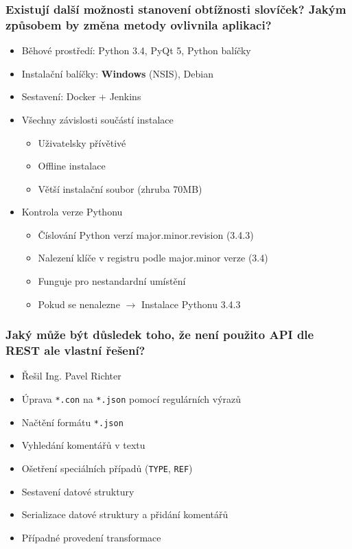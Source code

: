 \begin{frame}[noframenumbering]
\begin{center}
	\frametitle{Existují další možnosti stanovení obtížnosti slovíček? Jakým způsobem by změna metody ovlivnila aplikaci?}
	\begin{itemize}[<+->]
		\item Běhové prostředí: Python 3.4, PyQt 5, Python balíčky
		\item Instalační balíčky: \textbf{Windows} (NSIS), Debian
		\item Sestavení: Docker + Jenkins
		\item Všechny závislosti součástí instalace
		\begin{itemize}
			\item Uživatelsky přívětivé
			\item Offline instalace
			\item Větší instalační soubor (zhruba 70MB)
		\end{itemize}
		\item Kontrola verze Pythonu
		\begin{itemize}
			\item Číslování Python verzí major.minor.revision (3.4.3)
			\item Nalezení klíče v registru podle major.minor verze (3.4)
			\item Funguje pro nestandardní umístění
			\item Pokud se nenalezne $\rightarrow$ Instalace Pythonu 3.4.3
		\end{itemize}
	\end{itemize}
\end{center}
\end{frame}

\begin{frame}[noframenumbering]
\begin{center}
	\frametitle{Jaký může být důsledek toho, že není použito API dle REST ale vlastní řešení?}
	\begin{itemize}[<+->]
		\item Řešil Ing. Pavel Richter
		\item Úprava \texttt{*.con} na \texttt{*.json} pomocí regulárních výrazů
		\item Načtění formátu \texttt{*.json}
		\item Vyhledání komentářů v textu
		\item Ošetření speciálních případů (\texttt{TYPE}, \texttt{REF})
		\item Sestavení datové struktury
		\item Serializace datové struktury a přidání komentářů
		\item Případné provedení transformace
	\end{itemize}
\end{center}
\end{frame}

